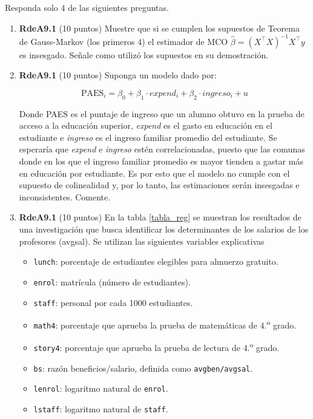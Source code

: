 \documentclass[10pt,a4paper]{article}
\begin{document}
Responda solo 4 de las siguientes preguntas.
\begin{enumerate}
    \item \textbf{RdeA9.1} (10 puntos) 
       Muestre que si se cumplen los supuestos de Teorema de Gauss-Markov (los primeros 4) el estimador de MCO $ \hat{\beta} = (X^{\top}X)^{-1}X^{\top}y$
es insesgado. Señale como utilizó los supuestos en su demostración.

 \item \textbf{RdeA9.1} (10 puntos) 
Suponga un modelo dado por:

$$\text{PAES}_i = \beta_0 + \beta_1 \cdot expend_i + \beta_2 \cdot ingreso_i + u$$

Donde PAES es el puntaje de ingreso que un alumno obtuvo en la prueba de acceso a la educación superior, \textit{expend} es el gasto en educación en el estudiante e \textit{ingreso} es el ingreso familiar promedio del estudiante. Se esperaría que \textit{expend} e \textit{ingreso} estén correlacionadas, puesto que las comunas donde en los que el ingreso familiar promedio es mayor tienden a gastar más en educación por estudiante. Es por esto que el modelo no cumple con el supuesto de colinealidad y, por lo tanto, las estimaciones serán insesgadas e inconsistentes. Comente.

 \item \textbf{RdeA9.1} (10 puntos) 
En la tabla \ref{tabla_reg}  se muestran los resultados de una investigación que busca identificar los determinantes de los salarios de los profesores (avgsal).  Se utilizan las siguientes variables explicativas 

\begin{itemize}
   \item \texttt{lunch}: porcentaje de estudiantes elegibles para almuerzo gratuito.
  \item \texttt{enrol}: matrícula (número de estudiantes).
  \item \texttt{staff}: personal por cada 1000 estudiantes.
 
  \item \texttt{math4}: porcentaje que aprueba la prueba de matemáticas de 4.\textsuperscript{o} grado.
  \item \texttt{story4}: porcentaje que aprueba la prueba de lectura de 4.\textsuperscript{o} grado.
  \item \texttt{bs}: razón beneficios/salario, definida como \texttt{avgben/avgsal}.
\item  \texttt{lenrol}: logaritmo natural de \texttt{enrol}.
  \item \texttt{lstaff}: logaritmo natural de \texttt{staff}.
\end{itemize}


\end{enumerate}
\end{document}
